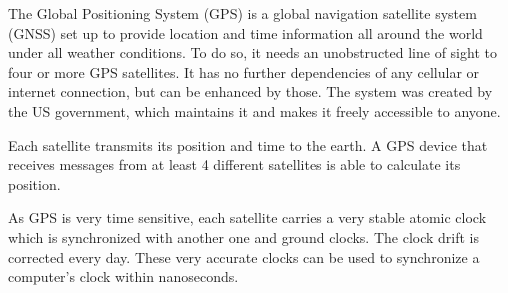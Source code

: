 The Global Positioning System (GPS) is a global navigation satellite system (GNSS) set up to provide location and time information all around the world under all weather conditions. To do so, it needs an unobstructed line of sight to four or more GPS satellites. It has no further dependencies of any cellular or internet connection, but can be enhanced by those. The system was created by the US government, which maintains it and makes it freely accessible to anyone.

Each satellite transmits its position and time to the earth. A GPS device that receives messages from at least 4 different satellites is able to calculate its position.

As GPS is very time sensitive, each satellite carries a very stable atomic clock which is synchronized with another one and ground clocks. The clock drift is corrected every day.
These very accurate clocks can be used to synchronize a computer’s clock within nanoseconds.

